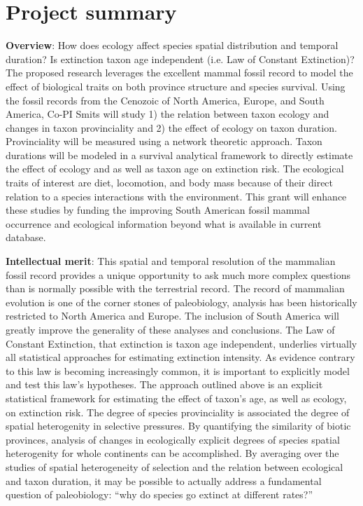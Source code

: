 \documentclass[11pt,letterpaper]{article}
\begin{document}
\setcounter{secnumdepth}{0}
\section{Project summary}

\textbf{Overview}:
How does ecology affect species spatial distribution and temporal duration? Is extinction taxon age independent (i.e. Law of Constant Extinction)? The proposed research leverages the excellent mammal fossil record to model the effect of biological traits on both province structure and species survival. Using the fossil records from the Cenozoic of North America, Europe, and South America, Co-PI Smits will study 1) the relation between taxon ecology and changes in taxon provinciality and 2) the effect of ecology on taxon duration. Provinciality will be measured using a network theoretic approach. Taxon durations will be modeled in a survival analytical framework to directly estimate the effect of ecology and as well as taxon age on extinction risk. The ecological traits of interest are diet, locomotion, and body mass because of their direct relation to a species interactions with the environment. This grant will enhance these studies by funding the improving South American fossil mammal occurrence and ecological information beyond what is available in current database.

\textbf{Intellectual merit}:
This spatial and temporal resolution of the mammalian fossil record provides a unique opportunity to ask much more complex questions than is normally possible with the terrestrial record. The record of mammalian evolution is one of the corner stones of paleobiology, analysis has been historically restricted to North America and Europe. The inclusion of South America will greatly improve the generality of these analyses and conclusions. 
The Law of Constant Extinction, that extinction is taxon age independent, underlies virtually all statistical approaches for estimating extinction intensity. As evidence contrary to this law is becoming increasingly common, it is important to explicitly model and test this law's hypotheses. The approach outlined above is an explicit statistical framework for estimating the effect of taxon's age, as well as ecology, on extinction risk. 
The degree of species provinciality is associated the degree of spatial heterogenity in selective pressures. By quantifying the similarity of biotic provinces, analysis of changes in ecologically explicit degrees of species spatial heterogenity for whole continents can be accomplished. 
By averaging over the studies of spatial heterogeneity of selection and the relation between ecological and taxon duration, it may be possible to actually address a fundamental question of paleobiology: ``why do species go extinct at different rates?''
\end{document}
